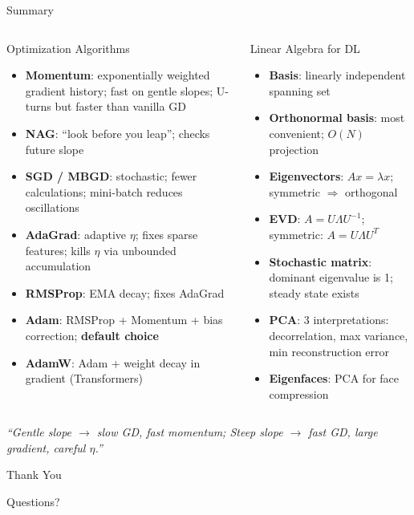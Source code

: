 \documentclass{beamer}
\begin{document}
\begin{frame}[shrink=10]{Summary}
  \begin{columns}[T]
    \begin{block}{Optimization Algorithms}
      \begin{itemize}\setlength\itemsep{4pt}
        \item \textbf{Momentum}: exponentially weighted gradient history;
              fast on gentle slopes; U-turns but faster than vanilla GD
        \item \textbf{NAG}: ``look before you leap''; checks future slope
        \item \textbf{SGD / MBGD}: stochastic; fewer calculations;
              mini-batch reduces oscillations
        \item \textbf{AdaGrad}: adaptive $\eta$; fixes sparse features;
              kills $\eta$ via unbounded accumulation
        \item \textbf{RMSProp}: EMA decay; fixes AdaGrad
        \item \textbf{Adam}: RMSProp + Momentum + bias correction;
              \textbf{default choice}
        \item \textbf{AdamW}: Adam + weight decay in gradient
              (Transformers)
      \end{itemize}
    \end{block}

    \begin{block}{Linear Algebra for DL}
      \begin{itemize}\setlength\itemsep{4pt}
        \item \textbf{Basis}: linearly independent spanning set
        \item \textbf{Orthonormal basis}: most convenient; $O(N)$
              projection
        \item \textbf{Eigenvectors}: $Ax=\lambda x$; symmetric
              $\Rightarrow$ orthogonal
        \item \textbf{EVD}: $A=U\Lambda U^{-1}$; symmetric:
              $A=U\Lambda U^T$
        \item \textbf{Stochastic matrix}: dominant eigenvalue is 1;
              steady state exists
        \item \textbf{PCA}: 3 interpretations: decorrelation,
              max variance, min reconstruction error
        \item \textbf{Eigenfaces}: PCA for face compression
      \end{itemize}
    \end{block}
  \end{columns}

  \medskip

  \begin{center}
    \large\textit{%
      ``Gentle slope $\to$ slow GD, fast momentum;
       Steep slope $\to$ fast GD, large gradient, careful $\eta$.''}
  \end{center}
\end{frame}

\begin{frame}
  \Huge{\centerline{Thank You}}
  \vspace{0.6cm}
  \large{\centerline{Questions?}}
\end{frame}
\end{document}
